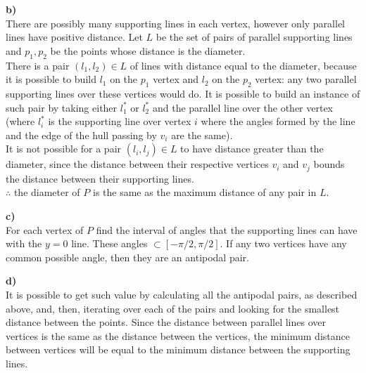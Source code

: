 \documentclass[]{article}
\begin{document}
	\noindent
	\textbf{b)} \\
	There are possibly many supporting lines in each vertex, however only parallel lines have positive distance. Let $L$ be the set of pairs of parallel supporting lines and $p_1, p_2$ be the points whose distance is the diameter.\\
	There is a pair $(l_1, l_2) \in L$ of lines with distance equal to the diameter, because it is possible to build $l_1$ on the $p_1$ vertex and $l_2$ on the $p_2$ vertex: any two parallel supporting lines over these vertices would do. It is possible to build an instance of such pair by taking either $l^*_1$ or $l^*_2$ and the parallel line over the other vertex (where $l^*_i$ is the supporting line over vertex $i$ where the angles formed by the line and the edge of the hull passing by $v_i$ are the same).\\
	It is not possible for a pair $(l_i, l_j) \in L$ to have distance greater than the diameter, since the distance between their respective vertices $v_i$ and $v_j$ bounds the distance between their supporting lines.\\
	$\therefore$ the diameter of $P$ is the same as the maximum distance of any pair in $L$.
	
	\noindent
	\textbf{c)}\\
	For each vertex of $P$ find the interval of angles that the supporting lines can have with the $y=0$ line. These angles $\subset [-\pi/2, \pi/2]$. If any two vertices have any common possible angle, then they are an antipodal pair.
	
	\noindent
	\textbf{d)}\\
	It is possible to get such value by calculating all the antipodal pairs, as described above, and, then, iterating over each of the pairs and looking for the smallest distance between the points. Since the distance between parallel lines over vertices is the same as the distance between the vertices, the minimum distance between vertices will be equal to the minimum distance between the supporting lines.
	
\end{document}

